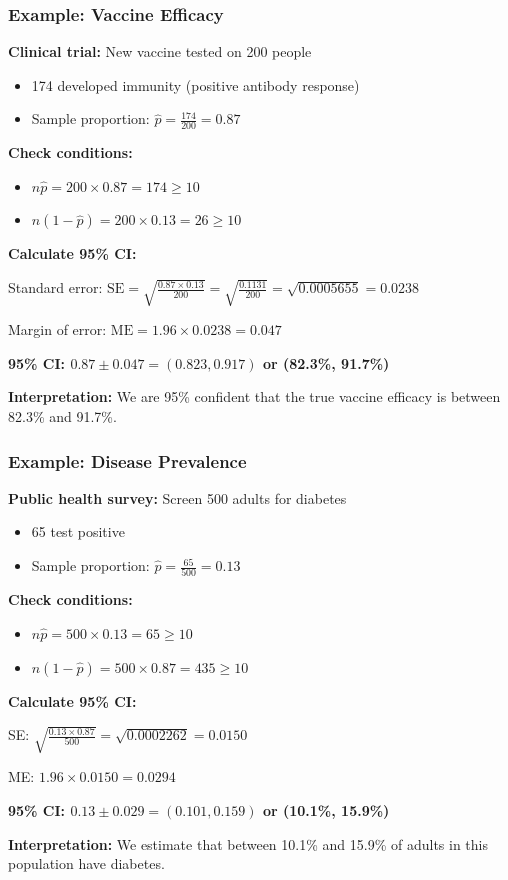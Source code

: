 \documentclass{beamer}
\begin{document}
\begin{frame}
\frametitle{Example: Vaccine Efficacy}
\textbf{Clinical trial:} New vaccine tested on 200 people
\begin{itemize}
\item 174 developed immunity (positive antibody response)
\item Sample proportion: $\hat{p} = \frac{174}{200} = 0.87$
\end{itemize}

\vspace{0.3cm}
\textbf{Check conditions:}
\begin{itemize}
\item $n\hat{p} = 200 \times 0.87 = 174 \geq 10$ \checkmark
\item $n(1-\hat{p}) = 200 \times 0.13 = 26 \geq 10$ \checkmark
\end{itemize}

\vspace{0.3cm}
\textbf{Calculate 95\% CI:}

Standard error: $\text{SE} = \sqrt{\frac{0.87 \times 0.13}{200}} = \sqrt{\frac{0.1131}{200}} = \sqrt{0.0005655} = 0.0238$

Margin of error: $\text{ME} = 1.96 \times 0.0238 = 0.047$

\textbf{95\% CI: $0.87 \pm 0.047 = (0.823, 0.917)$ or (82.3\%, 91.7\%)}

\vspace{0.3cm}
\textbf{Interpretation:} We are 95\% confident that the true vaccine efficacy is between 82.3\% and 91.7\%.
\end{frame}

\begin{frame}
\frametitle{Example: Disease Prevalence}
\textbf{Public health survey:} Screen 500 adults for diabetes
\begin{itemize}
\item 65 test positive
\item Sample proportion: $\hat{p} = \frac{65}{500} = 0.13$
\end{itemize}

\vspace{0.3cm}
\textbf{Check conditions:}
\begin{itemize}
\item $n\hat{p} = 500 \times 0.13 = 65 \geq 10$ \checkmark
\item $n(1-\hat{p}) = 500 \times 0.87 = 435 \geq 10$ \checkmark
\end{itemize}

\vspace{0.3cm}
\textbf{Calculate 95\% CI:}

SE: $\sqrt{\frac{0.13 \times 0.87}{500}} = \sqrt{0.0002262} = 0.0150$

ME: $1.96 \times 0.0150 = 0.0294$

\textbf{95\% CI: $0.13 \pm 0.029 = (0.101, 0.159)$ or (10.1\%, 15.9\%)}

\vspace{0.3cm}
\textbf{Interpretation:} We estimate that between 10.1\% and 15.9\% of adults in this population have diabetes.
\end{frame}
\end{document}
